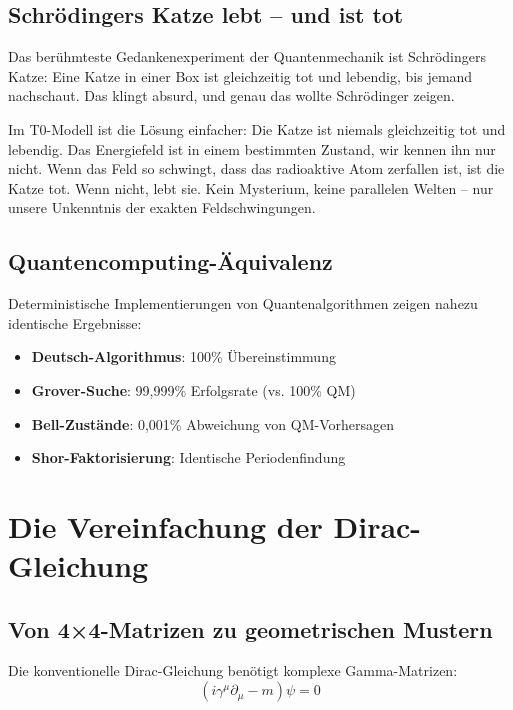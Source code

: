 	\subsection{Schrödingers Katze lebt -- und ist tot}
	
	Das berühmteste Gedankenexperiment der Quantenmechanik ist Schrödingers Katze: Eine Katze in einer Box ist gleichzeitig tot und lebendig, bis jemand nachschaut. Das klingt absurd, und genau das wollte Schrödinger zeigen.
	
	Im T0-Modell ist die Lösung einfacher: Die Katze ist niemals gleichzeitig tot und lebendig. Das Energiefeld ist in einem bestimmten Zustand, wir kennen ihn nur nicht. Wenn das Feld so schwingt, dass das radioaktive Atom zerfallen ist, ist die Katze tot. Wenn nicht, lebt sie. Kein Mysterium, keine parallelen Welten -- nur unsere Unkenntnis der exakten Feldschwingungen.
	
	\subsection{Quantencomputing-Äquivalenz}
	
	\begin{experimental}
		Deterministische Implementierungen von Quantenalgorithmen zeigen nahezu identische Ergebnisse:
		\begin{itemize}
			\item \textbf{Deutsch-Algorithmus}: 100\% Übereinstimmung
			\item \textbf{Grover-Suche}: 99,999\% Erfolgsrate (vs. 100\% QM)
			\item \textbf{Bell-Zustände}: 0,001\% Abweichung von QM-Vorhersagen
			\item \textbf{Shor-Faktorisierung}: Identische Periodenfindung
		\end{itemize}
	\end{experimental}
	
	\section{Die Vereinfachung der Dirac-Gleichung}
	
	\subsection{Von 4×4-Matrizen zu geometrischen Mustern}
	
	Die konventionelle Dirac-Gleichung benötigt komplexe Gamma-Matrizen:
	\begin{equation}
		(i\gamma^\mu \partial_\mu - m)\psi = 0
	\end{equation}
	
